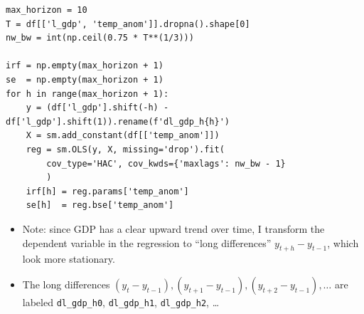\begin{frame}[fragile]
\scriptsize
\begin{verbatim}
max_horizon = 10
T = df[['l_gdp', 'temp_anom']].dropna().shape[0]
nw_bw = int(np.ceil(0.75 * T**(1/3)))

irf = np.empty(max_horizon + 1)
se  = np.empty(max_horizon + 1)
for h in range(max_horizon + 1):
    y = (df['l_gdp'].shift(-h) - df['l_gdp'].shift(1)).rename(f'dl_gdp_h{h}')
    X = sm.add_constant(df[['temp_anom']])
    reg = sm.OLS(y, X, missing='drop').fit(
        cov_type='HAC', cov_kwds={'maxlags': nw_bw - 1}
        )
    irf[h] = reg.params['temp_anom']
    se[h]  = reg.bse['temp_anom']
\end{verbatim}
\medskip
\normalsize
\begin{itemize}
\item Note: since GDP has a clear upward trend over time, I transform the dependent variable in the regression to ``long differences'' $y_{t+h}-y_{t-1}$, which look more stationary.
\item The long differences $(y_{t} - y_{t-1}),(y_{t+1} - y_{t-1}),(y_{t+2} - y_{t-1}),\dots$ are labeled \texttt{dl\_gdp\_h0}, \texttt{dl\_gdp\_h1}, \texttt{dl\_gdp\_h2}, \dots
\end{itemize}
\end{frame}

